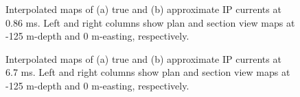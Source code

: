 \documentclass[extra,mreferee]{gji}
\begin{document}
\begin{figure}
  \caption{Interpolated maps of (a) true and (b) approximate IP currents at 0.86 ms. Left and right columns show plan and section view maps at -125 m-depth and 0 m-easting, respectively. }
  \label{F:IPcurrent_PlanandSec_early}
\end{figure}

\begin{figure}
  \caption{Interpolated maps of (a) true and (b) approximate IP currents at 6.7 ms. Left and right columns show plan and section view maps at -125 m-depth and 0 m-easting, respectively. }
  \label{F:IPcurrent_PlanandSec_late}
\end{figure}
\end{document}
